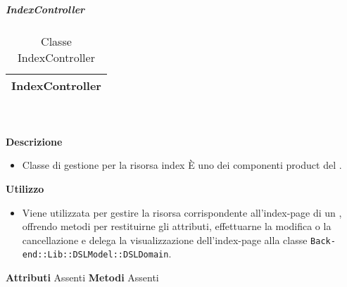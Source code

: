 			\subparagraph{IndexController} 
\begin{table}[ht]
\begin{center}
\bgroup
	\setlength{\arrayrulewidth}{0.6mm}
	\def\arraystretch{1}
		\begin{tabular}{ | p{12cm} | }
				\hline  
					\centerline{\textbf{IndexController}}
		\\ \hline 
				\hline
				\hline
		
		\end{tabular}
\egroup
\caption{Classe IndexController}
\end{center}
\end{table} \textbf{\\ \\ Descrizione}
\begin{itemize}
\item[] Classe di gestione per la risorsa index 
È uno dei componenti product del  .

\end{itemize} 
\textbf{Utilizzo}
\begin{itemize}
\item[] Viene utilizzata per gestire la risorsa corrispondente all'index-page di un , offrendo metodi per restituirne gli attributi, effettuarne la modifica o la cancellazione e delega la visualizzazione dell'index-page alla classe \texttt{Back-end::Lib::DSLModel::DSLDomain}.

\end{itemize}
\textbf{Attributi}
Assenti
\textbf{Metodi}
Assenti

